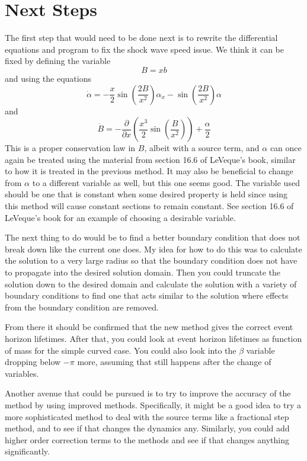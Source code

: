 \documentclass[12pt]{article}
\begin{document}
\section{Next Steps}

The first step that would need to be done next is to rewrite the differential equations
and program to fix the shock wave speed issue. We think it can be fixed by defining the
variable
\[ B = xb \]
and using the equations
\[ \dot{\alpha} = -\frac{x}{2}\sin\left(\frac{2B}{x^2}\right)\alpha_x -
\sin\left(\frac{2B}{x^2}\right)\alpha \]
and
\[ \dot{B} = -\frac{\partial}{\partial x} \left( \frac{x^3}{2}
\sin\left(\frac{B}{x^2}\right) \right) + \frac{\alpha}{2} \]
This is a proper conservation law in $B$, albeit with a source term, and $\alpha$ can
once again be treated using the material from section 16.6 of LeVeque's book, similar to
how it is treated in the previous method. It may also be beneficial to change from
$\alpha$ to a different variable as well, but this one seems good. The variable used
should be one that is constant when some desired property is held since using this
method will cause constant sections to remain constant. See section 16.6 of LeVeque's
book for an example of choosing a desirable variable.

The next thing to do would be to find a better boundary condition that does not break
down like the current one does. My idea for how to do this was to calculate the solution
to a very large radius so that the boundary condition does not have to propagate into
the desired solution domain. Then you could truncate the solution down to the desired
domain and calculate the solution with a variety of boundary conditions to find one that
acts similar to the solution where effects from the boundary condition are removed.

From there it should be confirmed that the new method gives the correct event horizon
lifetimes. After that, you could look at event horizon lifetimes as function of mass for
the simple curved case. You could also look into the $\beta$ variable dropping below
$-\pi$ more, assuming that still happens after the change of variables.

Another avenue that could be pursued is to try to improve the accuracy of the method by
using improved methods. Specifically, it might be a good idea to try a more
sophisticated method to deal with the source terms like a fractional step method, and to
see if that changes the dynamics any. Similarly, you could add higher order correction
terms to the methods and see if that changes anything significantly.
\end{document}
